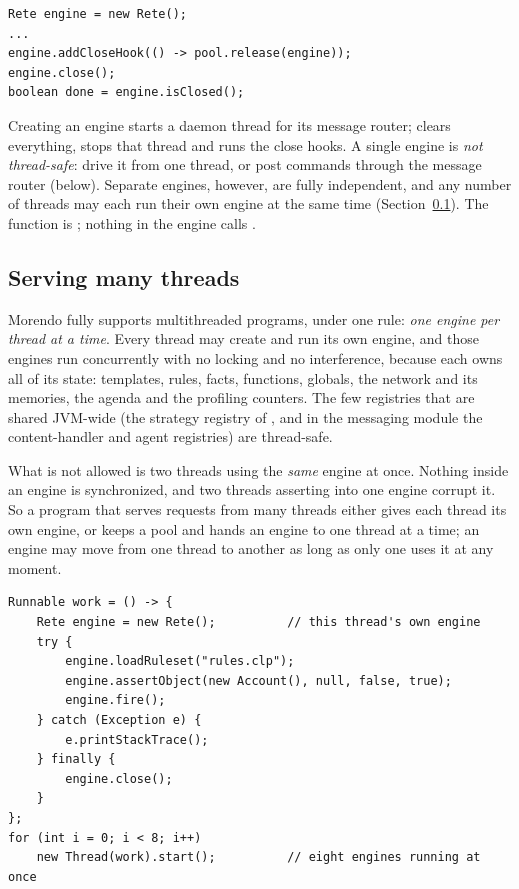 \begin{lstlisting}[style=java]
Rete engine = new Rete();
...
engine.addCloseHook(() -> pool.release(engine));
engine.close();
boolean done = engine.isClosed();
\end{lstlisting}

Creating an engine starts a daemon thread for its message router;
 clears everything, stops that thread and runs the close
hooks. A single engine is \emph{not thread-safe}: drive it from one
thread, or post commands through the message router (below). Separate
engines, however, are fully independent, and any number of threads may
each run their own engine at the same time
(Section~\ref{sec:threads}). The 
function is ; nothing in the engine calls .

\subsection{Serving many threads}
\label{sec:threads}

Morendo fully supports multithreaded programs, under one rule:
\emph{one engine per thread at a time}. Every thread may create and run
its own  engine, and those engines run concurrently with no
locking and no interference, because each owns all of its state:
templates, rules, facts, functions, globals, the network and its
memories, the agenda and the profiling counters. The few registries
that are shared JVM-wide (the strategy registry of , and
in the messaging module the content-handler and agent registries) are
thread-safe.

What is not allowed is two threads using the \emph{same} engine at
once. Nothing inside an engine is synchronized, and two threads
asserting into one engine corrupt it. So a program that serves requests
from many threads either gives each thread its own engine, or keeps a
pool and hands an engine to one thread at a time; an engine may move
from one thread to another as long as only one uses it at any moment.

\begin{lstlisting}[style=java]
Runnable work = () -> {
    Rete engine = new Rete();          // this thread's own engine
    try {
        engine.loadRuleset("rules.clp");
        engine.assertObject(new Account(), null, false, true);
        engine.fire();
    } catch (Exception e) {
        e.printStackTrace();
    } finally {
        engine.close();
    }
};
for (int i = 0; i < 8; i++)
    new Thread(work).start();          // eight engines running at once
\end{lstlisting}

